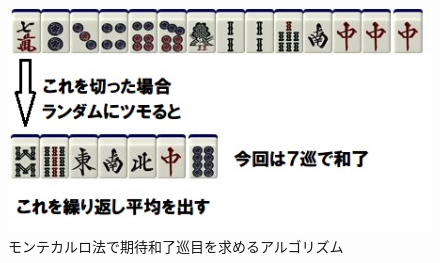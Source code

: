 \begin{figure}[h]
 \centering
 \includegraphics[keepaspectratio, scale=1,bb=0 0 300 200]
      {img/monte1.jpg}
 \caption{モンテカルロ法で期待和了巡目を求めるアルゴリズム}
 \label{monte2}
\end{figure}














